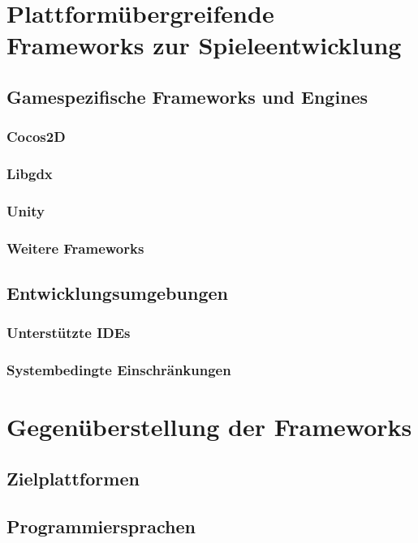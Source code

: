 \chapter{Plattformübergreifende Frameworks zur Spieleentwicklung}
\section{Gamespezifische Frameworks und Engines}
\subsection{Cocos2D}
\subsection{Libgdx}
\subsection{Unity}
\subsection{Weitere Frameworks}
\section{Entwicklungsumgebungen}
\subsection{Unterstützte IDEs}
\subsection{Systembedingte Einschränkungen}

\chapter{Gegenüberstellung der Frameworks}
\section{Zielplattformen}
\section{Programmiersprachen}
